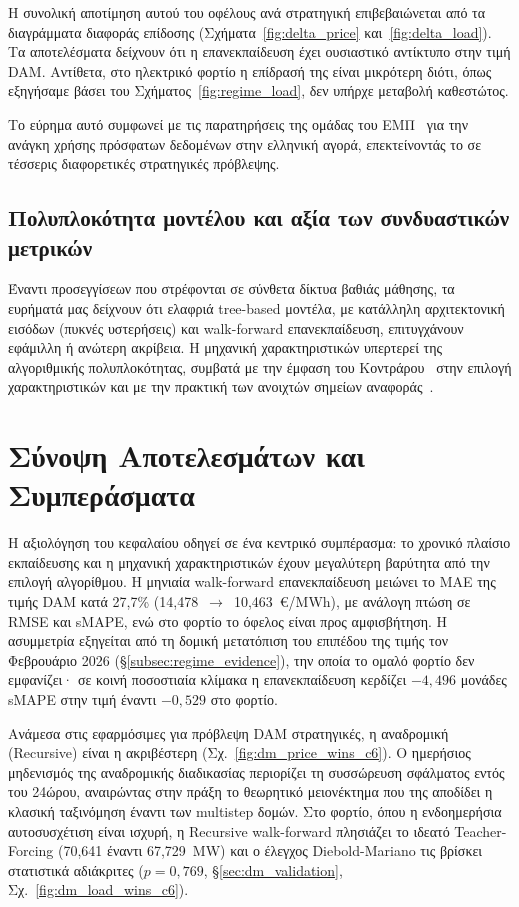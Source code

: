 Η συνολική αποτίμηση αυτού του οφέλους ανά στρατηγική επιβεβαιώνεται από τα διαγράμματα διαφοράς επίδοσης (Σχήματα~\ref{fig:delta_price} και~\ref{fig:delta_load}). Τα αποτελέσματα δείχνουν ότι η επανεκπαίδευση έχει ουσιαστικό αντίκτυπο στην τιμή DAM. Αντίθετα, στο ηλεκτρικό φορτίο η επίδρασή της είναι μικρότερη διότι, όπως εξηγήσαμε βάσει του Σχήματος~\ref{fig:regime_load}, δεν υπήρχε μεταβολή καθεστώτος.

Το εύρημα αυτό συμφωνεί με τις παρατηρήσεις της ομάδας του ΕΜΠ~\cite{ntua2025shortwindow} για την ανάγκη χρήσης πρόσφατων δεδομένων στην ελληνική αγορά, επεκτείνοντάς το σε τέσσερις διαφορετικές στρατηγικές πρόβλεψης.

\subsection{Πολυπλοκότητα μοντέλου και αξία των συνδυαστικών μετρικών}
\label{subsec:complexity_metrics}

Έναντι προσεγγίσεων που στρέφονται σε σύνθετα δίκτυα βαθιάς μάθησης, τα ευρήματά μας
δείχνουν ότι ελαφριά tree-based μοντέλα, με κατάλληλη αρχιτεκτονική εισόδων (πυκνές
υστερήσεις) και walk-forward επανεκπαίδευση, επιτυγχάνουν εφάμιλλη ή ανώτερη ακρίβεια.
Η μηχανική χαρακτηριστικών υπερτερεί της αλγοριθμικής πολυπλοκότητας, συμβατά με την
έμφαση του Κοντράρου~\cite{kontraros2023} στην επιλογή χαρακτηριστικών και με την
πρακτική των ανοιχτών σημείων αναφοράς~\cite{lago2021}.

\section{Σύνοψη Αποτελεσμάτων και Συμπεράσματα}
\label{sec:ch6_summary}

Η αξιολόγηση του κεφαλαίου οδηγεί σε ένα κεντρικό συμπέρασμα: το χρονικό πλαίσιο
εκπαίδευσης και η μηχανική χαρακτηριστικών έχουν μεγαλύτερη βαρύτητα από την επιλογή
αλγορίθμου. Η μηνιαία walk-forward επανεκπαίδευση μειώνει το MAE της τιμής DAM κατά
27,7\% (14,478~$\rightarrow$~10,463~€/MWh), με ανάλογη πτώση σε RMSE και sMAPE, ενώ στο
φορτίο το όφελος είναι προς αμφισβήτηση. Η ασυμμετρία εξηγείται από τη δομική μετατόπιση του
επιπέδου της τιμής τον Φεβρουάριο 2026 (§\ref{subsec:regime_evidence}), την οποία το
ομαλό φορτίο δεν εμφανίζει· σε κοινή ποσοστιαία κλίμακα η επανεκπαίδευση κερδίζει
$-4{,}496$ μονάδες sMAPE στην τιμή έναντι $-0{,}529$ στο φορτίο.

Ανάμεσα στις εφαρμόσιμες για πρόβλεψη DAM στρατηγικές, η αναδρομική (Recursive) είναι η
ακριβέστερη (Σχ.~\ref{fig:dm_price_wins_c6}). Ο ημερήσιος μηδενισμός της αναδρομικής
διαδικασίας περιορίζει τη συσσώρευση σφάλματος εντός του 24ώρου, αναιρώντας στην πράξη
το θεωρητικό μειονέκτημα που της αποδίδει η κλασική ταξινόμηση έναντι των multistep
δομών. Στο φορτίο, όπου η ενδοημερήσια αυτοσυσχέτιση είναι ισχυρή, η Recursive
walk-forward πλησιάζει το ιδεατό Teacher-Forcing (70,641 έναντι 67,729~MW) και ο έλεγχος
Diebold-Mariano τις βρίσκει στατιστικά αδιάκριτες ($p=0{,}769$,
§\ref{sec:dm_validation}, Σχ.~\ref{fig:dm_load_wins_c6}).

